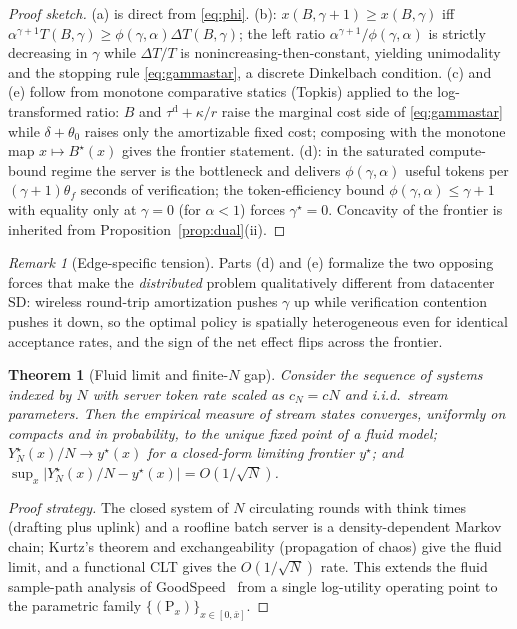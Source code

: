 \documentclass[11pt]{article}
\newtheorem{theorem}{Theorem}
\theoremstyle{definition}
\theoremstyle{remark}
\newtheorem{remark}{Remark}
\begin{document}
\begin{proof}[Proof sketch]
(a) is direct from \eqref{eq:phi}. (b): $x(B,\gamma+1)\ge x(B,\gamma)$ iff
$\alpha^{\gamma+1}T(B,\gamma)\ge\phi(\gamma,\alpha)\Delta T(B,\gamma)$; the
left ratio $\alpha^{\gamma+1}/\phi(\gamma,\alpha)$ is strictly decreasing in
$\gamma$ while $\Delta T/T$ is nonincreasing-then-constant, yielding
unimodality and the stopping rule \eqref{eq:gammastar}, a discrete
Dinkelbach condition. (c) and (e) follow from monotone comparative statics
(Topkis) applied to the log-transformed ratio: $B$ and
$\tau^{\mathrm{d}}+\kappa/r$ raise the marginal cost side of
\eqref{eq:gammastar} while $\delta+\theta_0$ raises only the amortizable
fixed cost; composing with the monotone map $x\mapsto B^{\star}(x)$ gives the
frontier statement. (d): in the saturated compute-bound regime the server is
the bottleneck and delivers $\phi(\gamma,\alpha)$ useful tokens per
$(\gamma+1)\theta_f$ seconds of verification; the token-efficiency bound
$\phi(\gamma,\alpha)\le\gamma+1$ with equality only at $\gamma=0$ (for
$\alpha<1$) forces $\gamma^{\star}=0$. Concavity of the frontier is inherited
from Proposition~\ref{prop:dual}(ii).
\end{proof}

\begin{remark}[Edge-specific tension]\label{rem:tension}
Parts (d) and (e) formalize the two opposing forces that make the
\emph{distributed} problem qualitatively different from datacenter SD:
wireless round-trip amortization pushes $\gamma$ up while verification
contention pushes it down, so the optimal policy is spatially heterogeneous
even for identical acceptance rates, and the sign of the net effect flips
across the frontier.
\end{remark}

\begin{theorem}[Fluid limit and finite-$N$ gap]\label{thm:fluid}
Consider the sequence of systems indexed by $N$ with server token rate
scaled as $c_N=cN$ and i.i.d.\ stream parameters. Then the empirical measure
of stream states converges, uniformly on compacts and in probability, to the
unique fixed point of a fluid model; $Y_N^{\star}(x)/N\to y^{\star}(x)$ for a
closed-form limiting frontier $y^{\star}$; and
$\sup_{x}\bigl|Y_N^{\star}(x)/N-y^{\star}(x)\bigr|=O(1/\sqrt{N})$.
\end{theorem}

\begin{proof}[Proof strategy]
The closed system of $N$ circulating rounds with think times (drafting plus
uplink) and a roofline batch server is a density-dependent Markov chain;
Kurtz's theorem and exchangeability (propagation of chaos) give the fluid
limit, and a functional CLT gives the $O(1/\sqrt{N})$ rate. This extends the
fluid sample-path analysis of GoodSpeed~\cite{tran2026goodspeed} from a
single log-utility operating point to the parametric family
$\{(\mathrm{P}_x)\}_{x\in[0,\bar{x}]}$.
\end{proof}
\end{document}

